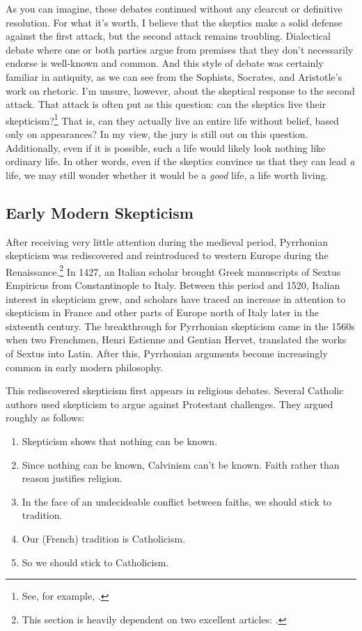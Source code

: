 As you can imagine, these debates continued without any clearcut or definitive resolution. For what it's worth, I believe that the skeptics make a solid defense against the first attack, but the second attack remains troubling. Dialectical debate where one or both parties argue from premises that they don't necessarily endorse is well-known and common. And this style of debate was certainly familiar in antiquity, as we can see from the Sophists, Socrates, and Aristotle's work on rhetoric. I'm unsure, however, about the skeptical response to the second attack. That attack is often put as this question: can the skeptics live their skepticism?\footnote{See, for example, \textcite{burnyeat1983a}.} That is, can they actually live an entire life without belief, based only on appearances? In my view, the jury is still out on this question. Additionally, even if it is possible, such a life would likely look nothing like ordinary life. In other words, even if the skeptics convince us that they can lead \textit{a} life, we may still wonder whether it would be a \textit{good} life, a life worth living.

\subsection*{Early Modern Skepticism}

After receiving very little attention during the medieval period, Pyrrhonian skepticism was rediscovered and reintroduced to western Europe during the Renaissance.\footnote{This section is heavily dependent on two excellent articles: \textcite{schmitt1983,popkin1993}.} In 1427, an Italian scholar brought Greek manuscripts of Sextus Empiricus from Constantinople to Italy. Between this period and 1520, Italian interest in skepticism grew, and scholars have traced an increase in attention to skepticism in France and other parts of Europe north of Italy later in the sixteenth century. The breakthrough for Pyrrhonian skepticism came in the 1560s when two Frenchmen, Henri Estienne  and Gentian Hervet, translated the works of Sextus into Latin. After this, Pyrrhonian arguments become increasingly common in early modern philosophy.

This rediscovered skepticism first appears in religious debates. Several Catholic authors used skepticism to argue against Protestant challenges. They argued roughly as follows:

\begin{enumerate}
    \item Skepticism shows that nothing can be known.
    \item Since nothing can be known, Calvinism can't be known. Faith rather than reason justifies religion.
    \item In the face of an undecideable conflict between faiths, we should stick to tradition.
    \item Our (French) tradition is Catholicism.
    \item So we should stick to Catholicism.
\end{enumerate}


